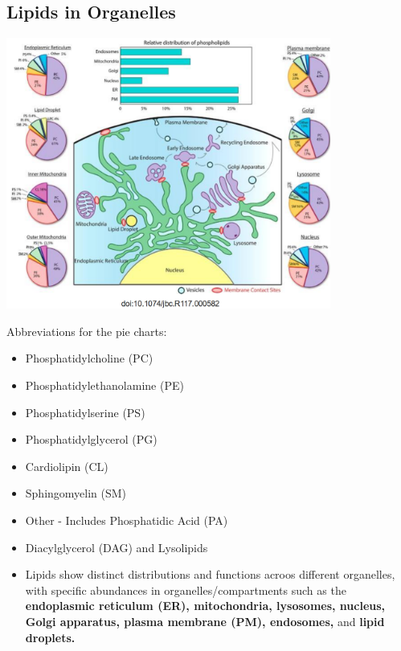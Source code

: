 \documentclass[10pt]{article}
\begin{document}
\subsection*{Lipids in Organelles}
\begin{center}
    \includegraphics*[width=0.8\textwidth]{L3_11.png}
\end{center}
Abbreviations for the pie charts:
\begin{itemize}
    \item Phosphatidylcholine (PC)
    \item Phosphatidylethanolamine (PE)
    \item Phosphatidylserine (PS)
    \item Phosphatidylglycerol (PG)
    \item Cardiolipin (CL)
    \item Sphingomyelin (SM)
    \item Other - Includes Phosphatidic Acid (PA)
    \item Diacylglycerol (DAG) and Lysolipids
\end{itemize}
\begin{itemize}
    \item Lipids show distinct distributions and functions acroos different organelles, with specific abundances in organelles/compartments such as the \textbf{endoplasmic reticulum (ER), mitochondria, lysosomes, nucleus, Golgi apparatus, plasma membrane (PM), endosomes,} and \textbf{lipid droplets.}
\end{itemize}
\pagebreak
\end{document}
